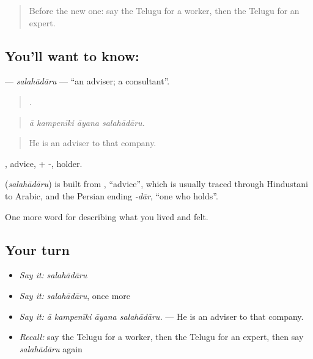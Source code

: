 \label{lesson:TE-C523-salahadaru}



\begin{quote}
Before the new one: say the Telugu for a worker, then the Telugu for an expert.
\end{quote}

\subsection*{You'll want to know: }
\textbf{} — \emph{salahādāru} — \textquotedblleft{}an adviser; a consultant\textquotedblright{}.

\begin{quote}
   .
\end{quote}

\begin{quote}
\emph{ā kampenīki āyana salahādāru.}
\end{quote}

\begin{quote}
He is an adviser to that company.
\end{quote}

, advice, + -, holder.

\begin{cousinweb}
\textbf{} (\emph{salahādāru}) is built from , \textquotedblleft{}advice\textquotedblright{}, which is usually traced through Hindustani to Arabic, and the Persian ending \emph{-dār}, \textquotedblleft{}one who holds\textquotedblright{}.
\end{cousinweb}

\begin{grammarlens}[title={What you've built}]
One more word for describing what you lived and felt.
\end{grammarlens}

\subsection*{Your turn}
\begin{itemize}
\raggedright
  \item \emph{Say it:} \emph{salahādāru}
  \item \emph{Say it:} \emph{salahādāru}, once more
  \item \emph{Say it:} \emph{ā kampenīki āyana salahādāru.} — He is an adviser to that company.
  \item \emph{Recall:} say the Telugu for a worker, then the Telugu for an expert, then say \emph{salahādāru} again
\end{itemize}

